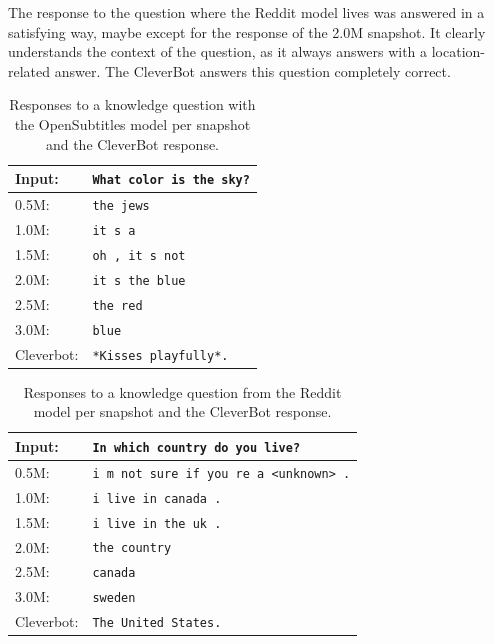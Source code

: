 The response to the question where the Reddit model lives was answered in a satisfying way, maybe except for the response of the 2.0M snapshot. It clearly understands the context of the question, as it always answers with a location-related answer. The CleverBot answers this question completely correct.

\begin{table}[H]
	\centering
	\begin{adjustbox}{max width=\textwidth}
		\begin{tabular}{ll}
			\toprule
			Input: 	& \texttt{What color is the sky?}\\
			\midrule
			0.5M: 	& \texttt{the jews}\\
			1.0M: 	& \texttt{it s a}\\
			1.5M:	& \texttt{oh , it s not}\\
			2.0M:	& \texttt{it s the blue}\\
			2.5M:	& \texttt{the red}\\
			3.0M:	& \texttt{blue}\\
			Cleverbot:&\texttt{*Kisses playfully*.}\\
			\bottomrule
		\end{tabular}
	\end{adjustbox}
	\caption{Responses to a knowledge question with the OpenSubtitles model per snapshot and the CleverBot response.}
	\label{results:example3_output:OpenSubtitle_compared}
\end{table}
\begin{table}[H]
	\centering
	\begin{adjustbox}{max width=\textwidth}
		\begin{tabular}{ll}
			\toprule
			Input: 	& \texttt{In which country do you live?}\\
			\midrule
			0.5M: 	& \texttt{i m not sure if you re a <unknown> .}\\
			1.0M: 	& \texttt{i live in canada .}\\
			1.5M:	& \texttt{i live in the uk .}\\
			2.0M:	& \texttt{the country}\\
			2.5M:	& \texttt{canada}\\
			3.0M:	& \texttt{sweden}\\
			Cleverbot:&\texttt{The United States.}\\
			\bottomrule
		\end{tabular}
	\end{adjustbox}
	\caption{Responses to a knowledge question from the Reddit model per snapshot and the CleverBot response.}
	\label{results:example3_output:Reddit_compared}
\end{table}

